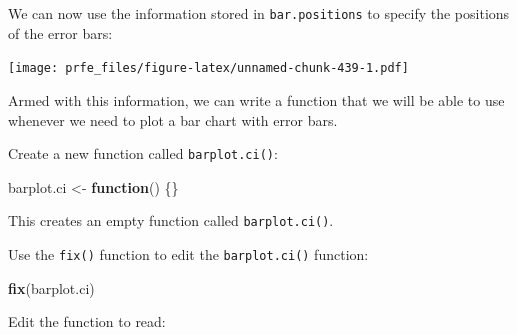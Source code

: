 \documentclass[12pt,a4paper]{book}
\newenvironment{Shaded}{\begin{snugshade}}{\end{snugshade}}
\newcommand{\ControlFlowTok}[1]{\textcolor[rgb]{0.13,0.29,0.53}{\textbf{#1}}}
\newcommand{\DataTypeTok}[1]{\textcolor[rgb]{0.13,0.29,0.53}{#1}}
\newcommand{\DecValTok}[1]{\textcolor[rgb]{0.00,0.00,0.81}{#1}}
\newcommand{\FloatTok}[1]{\textcolor[rgb]{0.00,0.00,0.81}{#1}}
\newcommand{\KeywordTok}[1]{\textcolor[rgb]{0.13,0.29,0.53}{\textbf{#1}}}
\newcommand{\NormalTok}[1]{#1}
\newcommand{\OperatorTok}[1]{\textcolor[rgb]{0.81,0.36,0.00}{\textbf{#1}}}
\newcommand{\StringTok}[1]{\textcolor[rgb]{0.31,0.60,0.02}{#1}}
\theoremstyle{definition}
\theoremstyle{definition}
\theoremstyle{definition}
\theoremstyle{remark}
\begin{document}
We can now use the information stored in \texttt{bar.positions} to
specify the positions of the error bars:

\begin{Shaded}
\end{Shaded}

\texttt{[image: prfe\_files/figure-latex/unnamed-chunk-439-1.pdf]}

Armed with this information, we can write a function that we will be
able to use whenever we need to plot a bar chart with error bars.

Create a new function called \texttt{barplot.ci()}:

\begin{Shaded}
\begin{Highlighting}[]
\NormalTok{barplot.ci <-}\StringTok{ }\ControlFlowTok{function}\NormalTok{() \{\}}
\end{Highlighting}
\end{Shaded}

This creates an empty function called \texttt{barplot.ci()}.

Use the \texttt{fix()} function to edit the \texttt{barplot.ci()}
function:

\begin{Shaded}
\begin{Highlighting}[]
\KeywordTok{fix}\NormalTok{(barplot.ci)}
\end{Highlighting}
\end{Shaded}

Edit the function to read:
\end{document}
